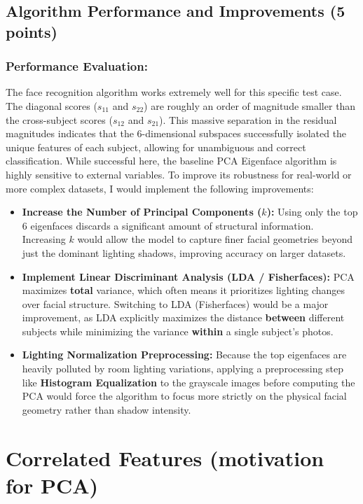 \documentclass[twoside, 10pt]{article}
\begin{document}
\subsection{Algorithm Performance and Improvements (5 points)}
\subsubsection{Performance Evaluation:} The face recognition algorithm works extremely well for this specific test case. The diagonal scores ($s_{11}$ and $s_{22}$) are roughly an order of magnitude smaller than the cross-subject scores ($s_{12}$ and $s_{21}$). This massive separation in the residual magnitudes indicates that the 6-dimensional subspaces successfully isolated the unique features of each subject, allowing for unambiguous and correct classification.
While successful here, the baseline PCA Eigenface algorithm is highly sensitive to external variables. To improve its robustness for real-world or more complex datasets, I would implement the following improvements:
\begin{itemize}
    \item \textbf{Increase the Number of Principal Components ($k$):} Using only the top 6 eigenfaces discards a significant amount of structural information. Increasing $k$ would allow the model to capture finer facial geometries beyond just the dominant lighting shadows, improving accuracy on larger datasets.
    \item \textbf{Implement Linear Discriminant Analysis (LDA / Fisherfaces):} PCA maximizes \textbf{total} variance, which often means it prioritizes lighting changes over facial structure. Switching to LDA (Fisherfaces) would be a major improvement, as LDA explicitly maximizes the distance \textbf{between} different subjects while minimizing the variance \textbf{within} a single subject's photos.
    \item \textbf{Lighting Normalization Preprocessing:} Because the top eigenfaces are heavily polluted by room lighting variations, applying a preprocessing step like \textbf{Histogram Equalization} to the grayscale images before computing the PCA would force the algorithm to focus more strictly on the physical facial geometry rather than shadow intensity.
\end{itemize}

\section{Correlated Features (motivation for PCA)} %
\end{document}
